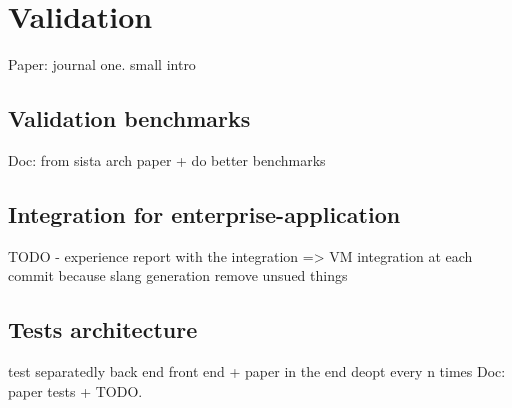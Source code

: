 \documentclass[a4paper,12pt,twoside]{../includes/ThesisStyle}
\begin{document}
\fi

\chapter{Validation}
\label{chap:validation}
\minitoc

Paper: journal one. 
small intro

\section{Validation benchmarks}


Doc: from sista arch paper + do better benchmarks

\section{Integration for enterprise-application}

TODO - experience report with the integration
=> VM integration at each commit because slang generation remove unsued things

\section{Tests architecture}

test separatedly back end front end + paper in the end deopt every n times
Doc: paper tests + TODO.

\ifx\wholebook\relax\else
    
\end{document}
